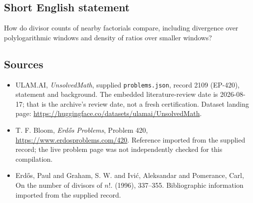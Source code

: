 \documentclass[11pt,a4paper]{article}
\begin{document}
\subsection{Short English statement}

How do divisor counts of nearby factorials compare, including divergence over polylogarithmic windows and density of ratios over smaller windows?

\subsection{Sources}

{\small

\begin{itemize}

\item[\hypertarget{source:2109:1}{S1}] ULAM.AI, \emph{UnsolvedMath}, supplied \texttt{problems.json}, record 2109 (EP-420), statement and background. The embedded literature-review date is 2026-08-17; that is the archive’s review date, not a fresh certification. Dataset landing page: \url{https://huggingface.co/datasets/ulamai/UnsolvedMath}.

\item[\hypertarget{source:2109:2}{S2}] T. F. Bloom, \emph{Erdős Problems}, Problem 420, \url{https://www.erdosproblems.com/420}. Reference imported from the supplied record; the live problem page was not independently checked for this compilation.

\item[\hypertarget{source:2109:3}{S3}] Erd\H{o}s, Paul and Graham, S. W. and Ivi\'c, Aleksandar and Pomerance, Carl, On the number of divisors of {$n!$}. (1996), 337--355. Bibliographic information imported from the supplied record.

\end{itemize}

}

\label{end:2109}
\end{document}
